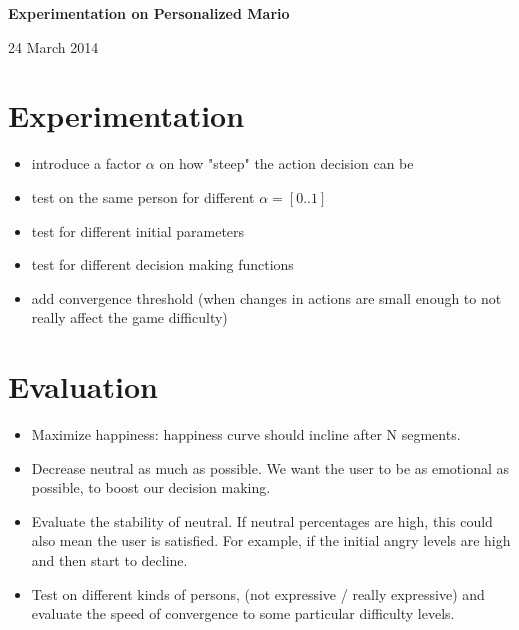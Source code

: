 \documentclass[11pt]{article}
\begin{document}
\begin{center}
\textbf{Experimentation on Personalized Mario}

24 March 2014
\end{center}

\section{Experimentation}
\begin{itemize}
\item introduce a factor $\alpha$ on how "steep" the action decision can be
\item test on the same person for different $\alpha = [0..1]$
\item test for different initial parameters
\item test for different decision making functions
\item add convergence threshold (when changes in actions are small enough to not really affect the game difficulty)
\end{itemize}

\section{Evaluation}


\begin{itemize}
\item Maximize happiness: happiness curve should incline after N segments.
\item Decrease neutral as much as possible. We want the user to be as emotional as possible, to boost our decision making.
\item Evaluate the stability of neutral. If neutral percentages are high, this could also mean the user is satisfied. For example, if the initial angry levels are high and then start to decline.
\item Test on different kinds of persons, (not expressive / really expressive) and evaluate the speed of convergence to some particular difficulty levels.

\end{itemize}
\end{document}

